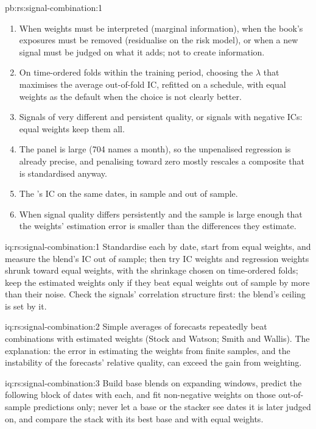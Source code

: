 \begin{solution}{pb:rs:signal-combination:1}
\begin{enumerate}
part and leaves the others with residual noise, which equal weights then overweight; the symmetric set changes each signal as little as possible.
\item When weights must be interpreted (marginal information), when the book's exposures must be removed (residualise on the risk model), or when a new
signal must be judged on what it adds; not to create information.
\item On time-ordered folds within the training period, choosing the $\lambda$ that maximises the average out-of-fold IC, refitted on a schedule, with
equal weights as the default when the choice is not clearly better.
\item Signals of very different and persistent quality, or signals with negative ICs: equal weights keep them all.
\item The panel is large (704 names a month), so the unpenalised regression is already precise, and penalising toward zero mostly rescales a composite
that is standardised anyway.
\item The 's IC on the same dates, in sample and out of sample.
\item When signal quality differs persistently and the sample is large enough that the weights' estimation error is smaller than the differences they
estimate.
\end{enumerate}
\end{solution}

\begin{solution}{iq:rs:signal-combination:1}
Standardise each by date, start from equal weights, and measure the blend's IC out of sample; then try IC weights and regression weights shrunk toward
equal weights, with the shrinkage chosen on time-ordered folds; keep the estimated weights only if they beat equal weights out of sample by more than
their noise. Check the signals' correlation structure first: the blend's ceiling is set by it.
\end{solution}

\begin{solution}{iq:rs:signal-combination:2}
Simple averages of forecasts repeatedly beat combinations with estimated weights (Stock and Watson; Smith and Wallis). The explanation: the error in
estimating the weights from finite samples, and the instability of the forecasts' relative quality, can exceed the gain from weighting.
\end{solution}

\begin{solution}{iq:rs:signal-combination:3}
Build base blends on expanding windows, predict the following block of dates with each, and fit non-negative  weights on those out-of-sample
predictions only; never let a base or the stacker see dates it is later judged on, and compare the stack with its best base and with equal weights.
\end{solution}

